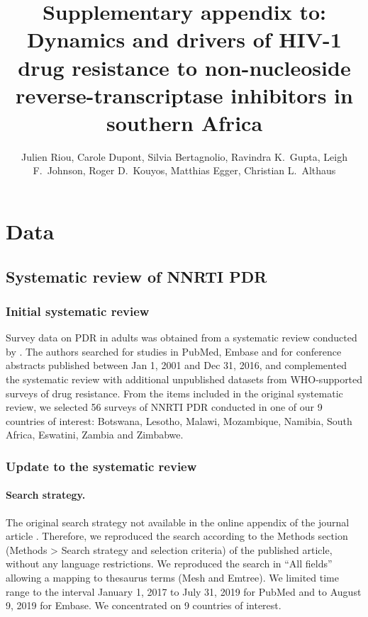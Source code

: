 \documentclass{article}
\title{{\sc Supplementary appendix to:} \\[.5em] Dynamics and drivers of HIV-1 drug resistance to non-nucleoside reverse-transcriptase inhibitors in southern Africa }
\author{Julien Riou, Carole Dupont, Silvia Bertagnolio, Ravindra K.~Gupta, Leigh F.~Johnson, Roger D.~Kouyos, Matthias Egger, Christian L.~Althaus}
\date{}
\begin{document}
	\maketitle
	\tableofcontents
	\clearpage
	
	\section{Data}
	\subsection{Systematic review of NNRTI PDR}
	
	
	
	
	\subsubsection{Initial systematic review}
	
	Survey data on PDR in adults was obtained from a systematic review conducted by \cite{gupta2018hiv}.
	The authors searched for studies in PubMed, Embase and for conference abstracts published between Jan 1, 2001 and Dec 31, 2016, and complemented the systematic review with additional unpublished datasets from WHO-supported surveys of drug resistance. From the items included in the original systematic review, we selected 56 surveys of NNRTI PDR conducted in one of our 9 countries of interest: Botswana, Lesotho, Malawi, Mozambique, Namibia, South Africa, Eswatini, Zambia and Zimbabwe. 
	
	
	\subsubsection{Update to the systematic review}
	
	\paragraph{Search strategy.}
	The original search strategy not available in the online appendix of the journal article \cite{gupta2018hiv}. Therefore, we reproduced the search according to the Methods section (Methods > Search strategy and selection criteria) of the published article, without any language restrictions. We reproduced the search in “All fields” allowing a mapping to thesaurus terms (Mesh and Emtree). We limited time range to the interval January 1, 2017 to July 31, 2019 for PubMed and to August 9, 2019 for Embase.
	We concentrated on 9 countries of interest.
	
\end{document}
